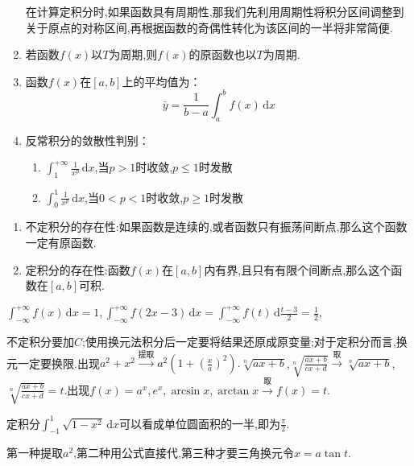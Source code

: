 \begin{enumerate}
在计算定积分时,如果函数具有周期性,那我们先利用周期性将积分区间调整到关于原点的对称区间,再根据函数的奇偶性转化为该区间的一半将非常简便.

\item 若函数$f(x)$以$T$为周期,则$f(x)$的原函数也以$T$为周期.
\item 函数$f(x)$在$[a,b]$上的平均值为：
\begin{equation*}
    \bar{y}=\frac{1}{b-a}\int_{a}^{b} f(x) \,\mathrm{d}x 
\end{equation*}

\item 反常积分的敛散性判别：
\begin{enumerate}
    \item $\displaystyle \int_{1}^{+\infty} \frac{1}{x^p} \,\mathrm{d}x $,当$p>1$时收敛,$p \leqslant 1$时发散
    \item $\displaystyle \int_{0}^{1} \frac{1}{x^p} \,\mathrm{d}x $,当$0<p<1$时收敛,$p \geqslant 1$时发散
\end{enumerate}
\end{enumerate}

\begin{theorem}[积分的存在性定理]
    \begin{enumerate}
    \item 不定积分的存在性:如果函数是连续的,或者函数只有振荡间断点,那么这个函数一定有原函数.
    \item 定积分的存在性:函数$f(x)$在$[a,b]$内有界,且只有有限个间断点,那么这个函数在$[a,b]$可积.
\end{enumerate}
\end{theorem}

$\int_{-\infty}^{+\infty}f(x)\,\mathrm{d}x=1,\int_{-\infty}^{+\infty}f(2x-3)\,\mathrm{d}x=\int_{-\infty}^{+\infty}f(t)\,\mathrm{d}\frac{t-3}{2}=\frac{1}{2},$

不定积分要加$C$;使用换元法积分后一定要将结果还原成原变量;对于定积分而言,换元一定要换限.出现$a^2+x^2 \xrightarrow{\text{提取}} a^2(1+(\frac{x}{a})^2).\sqrt[n]{ax+b}$,$\sqrt[n]{\frac{ax+b}{cx+d}}\xrightarrow{\text{取}} \sqrt[n]{ax+b}$,$\sqrt[n]{\frac{ax+b}{cx+d}}=t.$出现$f(x)=a^x,e^x,\arcsin x,\arctan x\xrightarrow{\text{取}} f(x)=t.$

定积分$\int_{-1}^{1} \sqrt{1-x^2} \,\mathrm{d}x $可以看成单位圆面积的一半,即为$\frac{\pi}{2}$.

第一种提取$a^2$,第二种用公式直接代,第三种才要三角换元令$x=a\tan t$.

